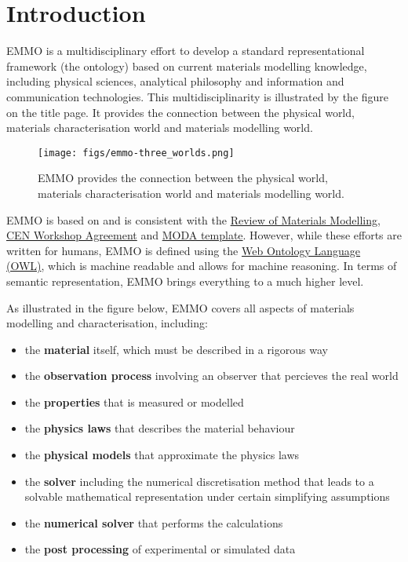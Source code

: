 \documentclass[a4paper,]{report}
\providecommand{\tightlist}{%
  \setlength{\itemsep}{0pt}\setlength{\parskip}{0pt}}
\begin{document}
{
\hypersetup{linkcolor=}
\setcounter{tocdepth}{1}
\tableofcontents
}
\hypertarget{introduction}{%
\chapter{Introduction}\label{introduction}}

EMMO is a multidisciplinary effort to develop a standard
representational framework (the ontology) based on current materials
modelling knowledge, including physical sciences, analytical philosophy
and information and communication technologies. This multidisciplinarity
is illustrated by the figure on the title page. It provides the
connection between the physical world, materials characterisation world
and materials modelling world.

\begin{figure}
\centering
\texttt{[image: figs/emmo-three\_worlds.png]}
\caption{EMMO provides the connection between the physical world,
materials characterisation world and materials modelling world.}
\end{figure}

EMMO is based on and is consistent with the
\href{https://publications.europa.eu/en/publication-detail/-/publication/ec1455c3-d7ca-11e6-ad7c-01aa75ed71a1}{Review
of Materials Modelling},
\href{https://www.cen.eu/news/workshops/Pages/WS_2016-013.aspx}{CEN
Workshop Agreement} and
\href{https://emmc.info/moda-workflow-templates/}{MODA template}.
However, while these efforts are written for humans, EMMO is defined
using the \href{https://en.wikipedia.org/wiki/Web_Ontology_Language}{Web
Ontology Language (OWL)}, which is machine readable and allows for
machine reasoning. In terms of semantic representation, EMMO brings
everything to a much higher level.

As illustrated in the figure below, EMMO covers all aspects of materials
modelling and characterisation, including:

\begin{itemize}
\tightlist
\item
  the \textbf{material} itself, which must be described in a rigorous
  way
\item
  the \textbf{observation process} involving an observer that percieves
  the real world
\item
  the \textbf{properties} that is measured or modelled
\item
  the \textbf{physics laws} that describes the material behaviour
\item
  the \textbf{physical models} that approximate the physics laws
\item
  the \textbf{solver} including the numerical discretisation method that
  leads to a solvable mathematical representation under certain
  simplifying assumptions
\item
  the \textbf{numerical solver} that performs the calculations
\item
  the \textbf{post processing} of experimental or simulated data
\end{itemize}
\end{document}
